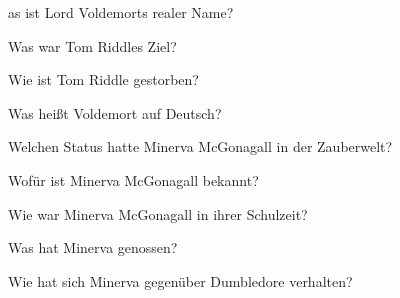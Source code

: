 \documentclass[20pt]{memoir}
\begin{document}
\begin{center}

\newpage

\begin{vplace}[1]
{\HUGE as ist Lord Voldemorts realer Name?
}
\end{vplace}

\newpage

\begin{vplace}[1]
{\HUGE Was war Tom Riddles Ziel?
}
\end{vplace}

\newpage

\begin{vplace}[1]
{\HUGE Wie ist Tom Riddle gestorben?
}
\end{vplace}

\newpage

\begin{vplace}[1]
{\HUGE Was heißt Voldemort auf Deutsch?
}
\end{vplace}

\newpage

\begin{vplace}[1]
{\HUGE Welchen Status hatte Minerva McGonagall in der Zauberwelt?
}
\end{vplace}

\newpage

\begin{vplace}[1]
{\HUGE Wofür ist Minerva McGonagall bekannt?
}
\end{vplace}

\newpage

\begin{vplace}[1]
{\HUGE Wie war Minerva McGonagall in ihrer Schulzeit?
}
\end{vplace}

\newpage

\begin{vplace}[1]
{\HUGE Was hat Minerva genossen?
}
\end{vplace}

\newpage

\begin{vplace}[1]
{\HUGE Wie hat sich Minerva gegenüber Dumbledore verhalten?
}
\end{vplace}

\newpage


\end{center}
\end{document}
